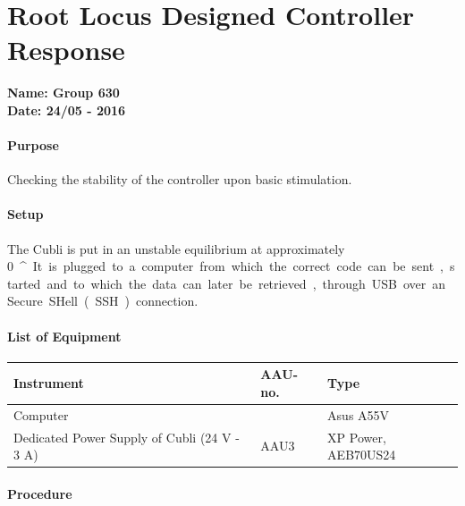 \chapter{Root Locus Designed Controller Response} \label{app:hSISOControllerFinalTest}
\textbf{Name: Group 630}\\
\textbf{Date: 24/05 - 2016}

\subsubsection{Purpose}
Checking the stability of the controller upon basic stimulation.

\subsubsection{Setup}
The Cubli is put in an unstable equilibrium at approximately \SI{0}{^{\circ}}. 
It is plugged to a computer from which the correct code can be sent, started and to which the data can later be retrieved, through USB over an Secure SHell (SSH) connection.

\subsubsection{List of Equipment}
\begin{table}[H]
	\centering
\begin{tabular}{|p{8cm}|p{2cm}|p{4cm}|}
\hline%
  \textbf{Instrument}    &  \textbf{AAU-no.}          &  \textbf{Type} \\
\hline%
  Computer               &            &  Asus A55V  \\
\hline%
Dedicated Power Supply of Cubli \small{(24 V - 3 A)} &  AAU3                   &  XP Power, AEB70US24                 \\
\hline%
\end{tabular}
\end{table}

\subsubsection{Procedure}

